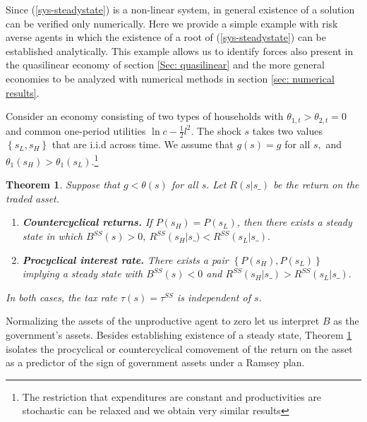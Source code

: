 \documentclass[thmsb,11pt]{article}
\newtheorem{theorem}{Theorem}
\begin{document}
Since  (\ref{sys-steadystate}) is a non-linear system, in general existence of a solution can   be verified only numerically.
      Here we provide a simple example with risk averse agents in which the existence of a root of (\ref{sys-steadystate}) can be established analytically. 
      This example allows us to identify forces also present in the quasilinear economy
of section \ref{Sec: quasilinear} and  the more general economies to be analyzed with numerical methods in section \ref{sec: numerical results}.

Consider an economy consisting of  two types of households with $%
\theta _{1,t}>\theta _{2,t}=0$ and common one-period utilities  $\ln c-\frac{1}{2}%
l^{2}.$ The shock $s$  takes  two values$ \left\{
s_{L},s_{H}\right\} $ that are i.i.d across time.  We assume that $g\left( s\right) =g$ for all $s,$
and $\theta _{1}\left( s_{H}\right) >\theta _{1}\left( s_{L}\right) .$\footnote{The restriction that expenditures are constant and productivities are stochastic can be relaxed and we obtain very similar results}
\smallskip

\begin{theorem}
\label{thm long run forces}\smallskip Suppose that $g<\theta (s)$ for all $%
s.$ Let $R(s|s\_)$ be the return on the traded asset.

\begin{enumerate}
\item \textbf{Countercyclical returns.} If $P \left( s_{H}\right) =P\left( s_{L}\right)$, then
there exists a steady state in which
$B^{SS}(s)>0,\ R^{SS}\left( s_{H}\right|s\_) <R^{SS}\left( s_{L}|s\_\right) .$
\item \textbf{Procyclical interest rate.} There exists a pair  $\left\{ P \left( s_{H}\right) ,P\left( s_{L}\right)
\right\} $ implying a steady state with $B^{SS}(s)<0$ and  $R^{SS}\left( s_{H}|s\_\right) >R^{SS}\left( s_{L}|s\_\right) .$
\end{enumerate}
In both cases, the tax rate $\tau(s)=\tau^{SS}$ is independent of $s$.
\end{theorem}



Normalizing the assets of the unproductive agent to zero %
let us  interpret $B$ as the government's assets.
Besides establishing existence of a steady state, Theorem \ref{thm long run forces}
isolates the procyclical or countercyclical comovement of the return on the asset as a predictor of  the sign of government assets under a Ramsey plan.
\end{document}
